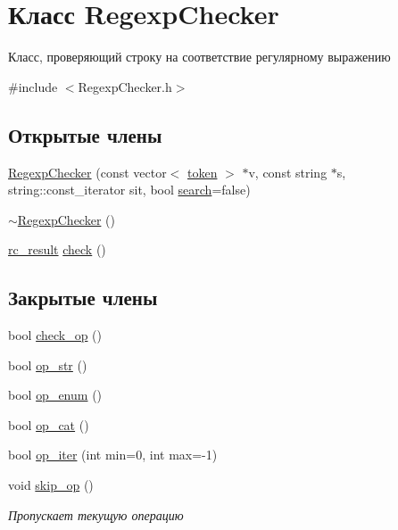 \hypertarget{class_regexp_checker}{}\section{Класс Regexp\+Checker}
\label{class_regexp_checker}


Класс, проверяющий строку на соответствие регулярному выражению  




{\ttfamily \#include $<$Regexp\+Checker.\+h$>$}

\subsection*{Открытые члены}
\begin{DoxyCompactItemize}
\item 
\hyperlink{class_regexp_checker_a44a66429366e8d24ec92d07ea2f0e86f}{Regexp\+Checker} (const vector$<$ \hyperlink{structtoken}{token} $>$ $\ast$v, const string $\ast$s, string\+::const\+\_\+iterator sit, bool \hyperlink{class_regexp_checker_a76fa7992eddb6adcd63d9df0e5db1a92}{search}=false)
\item 
\hyperlink{class_regexp_checker_aa2e7c0de7bb85d60f905535f0d2a65e5}{$\sim$\+Regexp\+Checker} ()
\item 
\hyperlink{structrc__result}{rc\+\_\+result} \hyperlink{class_regexp_checker_a58d9c7c69c53ef18fa6ddb6a2c4bf24f}{check} ()
\end{DoxyCompactItemize}
\subsection*{Закрытые члены}
\begin{DoxyCompactItemize}
\item 
bool \hyperlink{class_regexp_checker_a12a12dfe322def2c802afd2ebea0b75f}{check\+\_\+op} ()
\item 
bool \hyperlink{class_regexp_checker_ad48539a0443212d78e32ff0a23918478}{op\+\_\+str} ()
\item 
bool \hyperlink{class_regexp_checker_aa775725022ae645c6d8f12633aa3a3d4}{op\+\_\+enum} ()
\item 
bool \hyperlink{class_regexp_checker_a3f379e2420eacf52f91afce6e0ade9e4}{op\+\_\+cat} ()
\item 
bool \hyperlink{class_regexp_checker_a5a34d99e02dba23757f33ce8107a961d}{op\+\_\+iter} (int min=0, int max=-\/1)
\item 
void \hyperlink{class_regexp_checker_adf00606a82e27c614122d001f21f9f96}{skip\+\_\+op} ()
\begin{DoxyCompactList}\small\item\em Пропускает текущую операцию \end{DoxyCompactList}\end{DoxyCompactItemize}
